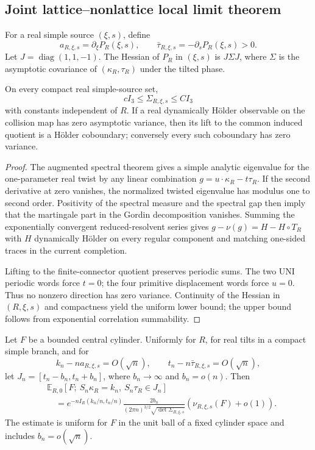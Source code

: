 \subsection{Joint lattice--nonlattice local limit theorem}

For a real simple source \((\xi,s)\), define
\[
 a_{R,\xi,s}=\partial_\xi P_R(\xi,s),
 \qquad
 \bar\tau_{R,\xi,s}=-\partial_sP_R(\xi,s)>0.
\]
Let \(J=\operatorname{diag}(1,1,-1)\).  The Hessian of \(P_R\) in
\((\xi,s)\) is \(J\Sigma J\), where \(\Sigma\) is the asymptotic covariance
of \((\kappa_R,\tau_R)\) under the tilted phase.

\begin{lemma}
\label{lem:r3-a2-cov}
On every compact real simple-source set,
\[
 cI_3\le\Sigma_{R,\xi,s}\le CI_3
\]
with constants independent of \(R\).  If a real dynamically H\"older
observable on the collision map has zero asymptotic variance, then its lift to
the common induced quotient is a H\"older coboundary; conversely every such
coboundary has zero variance.
\end{lemma}

\begin{proof}
The augmented spectral theorem gives a simple analytic eigenvalue for the
one-parameter real twist by any linear combination
\(g=u\cdot\kappa_R-t\tau_R\).  If the second derivative at zero vanishes,
the normalized twisted eigenvalue has modulus one to second order.  Positivity
of the spectral measure and the spectral gap then imply that the martingale
part in the Gordin decomposition vanishes.  Summing the exponentially
convergent reduced-resolvent series gives
\(g-\nu(g)=H-H\circ T_R\) with \(H\) dynamically H\"older on every regular
component and matching one-sided traces in the current completion.

Lifting to the finite-connector quotient preserves periodic sums.  The two UNI
periodic words force \(t=0\); the four primitive displacement words force
\(u=0\).  Thus no nonzero direction has zero variance.  Continuity of the
Hessian in \((R,\xi,s)\) and compactness yield the uniform lower bound; the
upper bound follows from exponential correlation summability.
\end{proof}

\begin{theorem}
\label{thm:r3-a2-llt}
Let \(F\) be a bounded central cylinder.  Uniformly for \(R\), for real tilts
in a compact simple branch, and for
\[
 k_n-na_{R,\xi,s}=O(\sqrt n),
 \qquad
 t_n-n\bar\tau_{R,\xi,s}=O(\sqrt n),
\]
let \(J_n=[t_n-b_n,t_n+b_n]\), where
\(b_n\to\infty\) and \(b_n=o(n)\).  Then
\[
 \begin{aligned}
 &\mathbb E_{R,0}
 \left[F;\ S_n\kappa_R=k_n,\ S_n\tau_R\in J_n\right]\\
 &\quad=e^{-nI_R(k_n/n,t_n/n)}
 \frac{2b_n}{(2\pi n)^{3/2}\sqrt{\det\Sigma_{R,\xi,s}}}
 \left(\nu_{R,\xi,s}(F)+o(1)\right).
 \end{aligned}
\]
The estimate is uniform for \(F\) in the unit ball of a fixed cylinder space
and includes \(b_n=o(\sqrt n)\).
\end{theorem}

